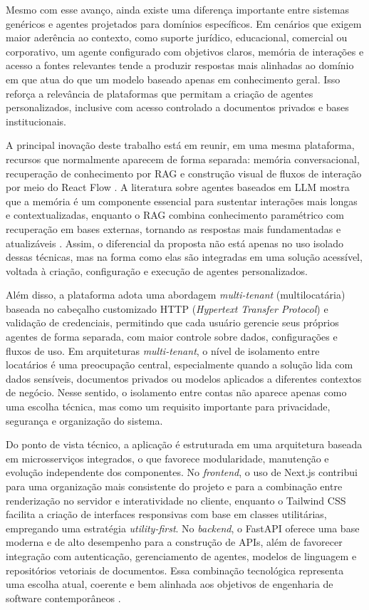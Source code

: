 \documentclass[12pt, openright, oneside, a4paper, brazil]{ads-unipac-abntex2}
\begin{document}
Mesmo com esse avanço, ainda existe uma diferença importante entre sistemas genéricos e agentes projetados para domínios específicos. Em cenários que exigem maior aderência ao contexto, como suporte jurídico, educacional, comercial ou corporativo, um agente configurado com objetivos claros, memória de interações e acesso a fontes relevantes tende a produzir respostas mais alinhadas ao domínio em que atua do que um modelo baseado apenas em conhecimento geral. Isso reforça a relevância de plataformas que permitam a criação de agentes personalizados, inclusive com acesso controlado a documentos privados e bases institucionais. 

A principal inovação deste trabalho está em reunir, em uma mesma plataforma, recursos que normalmente aparecem de forma separada: memória conversacional, recuperação de conhecimento por RAG \cite{lewis2020rag} e construção visual de fluxos de interação por meio do React Flow \cite{reactflow2023}. A literatura sobre agentes baseados em LLM mostra que a memória é um componente essencial para sustentar interações mais longas e contextualizadas, enquanto o RAG combina conhecimento paramétrico com recuperação em bases externas, tornando as respostas mais fundamentadas e atualizáveis \cite{santos2023rag}. Assim, o diferencial da proposta não está apenas no uso isolado dessas técnicas, mas na forma como elas são integradas em uma solução acessível, voltada à criação, configuração e execução de agentes personalizados. 

Além disso, a plataforma adota uma abordagem \textit{multi-tenant} (multilocatária) baseada no cabeçalho customizado HTTP (\textit{Hypertext Transfer Protocol}) e validação de credenciais, permitindo que cada usuário gerencie seus próprios agentes de forma separada, com maior controle sobre dados, configurações e fluxos de uso. Em arquiteturas \textit{multi-tenant}, o nível de isolamento entre locatários é uma preocupação central, especialmente quando a solução lida com dados sensíveis, documentos privados ou modelos aplicados a diferentes contextos de negócio. Nesse sentido, o isolamento entre contas não aparece apenas como uma escolha técnica, mas como um requisito importante para privacidade, segurança e organização do sistema. 

Do ponto de vista técnico, a aplicação é estruturada em uma arquitetura baseada em microsserviços integrados, o que favorece modularidade, manutenção e evolução independente dos componentes. No \textit{frontend}, o uso de Next.js \cite{verma2024nextjs} contribui para uma organização mais consistente do projeto e para a combinação entre renderização no servidor e interatividade no cliente, enquanto o Tailwind CSS facilita a criação de interfaces responsivas com base em classes utilitárias, empregando uma estratégia \textit{utility-first}. No \textit{backend}, o FastAPI \cite{tiangolo2018fastapi} oferece uma base moderna e de alto desempenho para a construção de APIs, além de favorecer integração com autenticação, gerenciamento de agentes, modelos de linguagem e repositórios vetoriais de documentos. Essa combinação tecnológica representa uma escolha atual, coerente e bem alinhada aos objetivos de engenharia de software contemporâneos \cite{sommerville2011eng}. 
\end{document}
